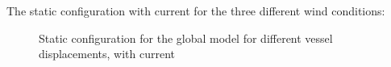 The static configuration with current for the three different wind conditions: 
\begin{figure}[H]
\hfill
{}\hfill
  \hfill
\caption{Static configuration for the global model for different vessel displacements, with current}
\label{fig:statconc}
\end{figure}

